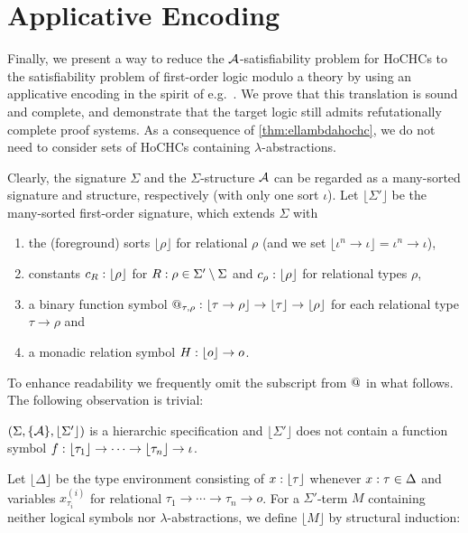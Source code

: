 \documentclass[a4paper,twoside,notitlepage,openright,11pt]{report}
\begin{document}
\section{Applicative Encoding}
\label{sec:appenc}
\label{SEC:APPENC}


Finally, we present a way to reduce the $\mathcal A$-satisfiability problem for HoCHCs to the satisfiability problem of first-order logic modulo a theory by using an applicative encoding in the spirit of e.g.\ \cite{BD83,K91,BKPU16}. We prove that this translation is sound and complete, and demonstrate that the target logic still admits refutationally complete proof systems.
As a consequence of \cref{thm:ellambdahochc}, we do not need to consider sets of HoCHCs containing $\lambda$-abstractions.


Clearly, the signature $\Sigma$ and the $\Sigma$-structure $\mathcal A$ can be regarded as a many-sorted signature and structure, respectively (with only one sort $\iota$).
Let $\lfloor\Sigma'\rfloor$ be the many-sorted first-order signature, which extends $\Sigma$ with
\begin{enumerate}[noitemsep]
\item the (foreground) sorts $\lfloor\rho\rfloor$ for relational $\rho$ (and we set $\lfloor\iota^n\to\iota\rfloor=\iota^n\to\iota$),
\item constants $c_R:\lfloor\rho\rfloor$ for $R:\rho\in\Sigma'\setminus\Sigma$ and $c_\rho:\lfloor\rho\rfloor$ for relational types $\rho$,
\item a binary function symbol $\operatorname{@}_{\tau,\rho}:\lfloor\tau\to\rho\rfloor\to\lfloor\tau\rfloor\to\lfloor\rho\rfloor$ for each relational type $\tau\to\rho$ and
\item a monadic relation symbol $H:\lfloor o\rfloor\to o$.
\end{enumerate}
To enhance readability we frequently omit the subscript from $\operatorname{@}$ in what follows. The following observation is trivial:
\begin{lemma}
  \label{lem:suffcomp}
  $(\Sigma,\{\mathcal A\},\lfloor\Sigma'\rfloor)$ is a hierarchic specification and $\lfloor\Sigma'\rfloor$ does not contain a function symbol $f:\lfloor\tau_1\rfloor\to\cdots\to\lfloor\tau_n\rfloor\to\iota$.
\end{lemma}
Let $\lfloor\Delta\rfloor$ be the type environment consisting of $x:\lfloor\tau\rfloor$ whenever $x:\tau\in\Delta$ and variables $x_{\tau_i}^{(i)}$ for relational $\tau_1\to\cdots\to\tau_n\to o$.
For a $\Sigma'$-term $M$ containing neither logical symbols nor $\lambda$-abstractions, we define $\lfloor M\rfloor$ by structural induction:
\end{document}
